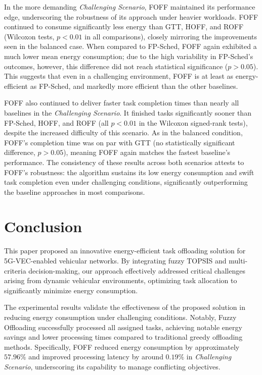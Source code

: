 \documentclass[iicol]{sn-jnl}
\begin{document}
In the more demanding \textit{Challenging Scenario}, FOFF maintained its performance edge, underscoring the robustness of its approach under heavier workloads. FOFF continued to consume significantly less energy than GTT, HOFF, and ROFF (Wilcoxon tests, $p < 0.01$ in all comparisons), closely mirroring the improvements seen in the balanced case. When compared to FP-Sched, FOFF again exhibited a much lower mean energy consumption; due to the high variability in FP-Sched’s outcomes, however, this difference did not reach statistical significance ($p > 0.05$). This suggests that even in a challenging environment, FOFF is at least as energy-efficient as FP-Sched, and markedly more efficient than the other baselines.

FOFF also continued to deliver faster task completion times than nearly all baselines in the \textit{Challenging Scenario}. It finished tasks significantly sooner than FP-Sched, HOFF, and ROFF (all $p < 0.01$ in the Wilcoxon signed-rank tests), despite the increased difficulty of this scenario. As in the balanced condition, FOFF’s completion time was on par with GTT (no statistically significant difference, $p > 0.05$), meaning FOFF again matches the fastest baseline’s performance. The consistency of these results across both scenarios attests to FOFF’s robustness: the algorithm sustains its low energy consumption and swift task completion even under challenging conditions, significantly outperforming the baseline approaches in most comparisons.

\section{Conclusion}\label{sec_conclusion}
This paper proposed an innovative energy-efficient task offloading solution for 5G-VEC-enabled vehicular networks. By integrating fuzzy TOPSIS and multi-criteria decision-making, our approach effectively addressed critical challenges arising from dynamic vehicular environments, optimizing task allocation to significantly minimize energy consumption.

The experimental results validate the effectiveness of the proposed solution in reducing energy consumption under challenging conditions. Notably, Fuzzy Offloading successfully processed all assigned tasks, achieving notable energy savings and lower processing times compared to traditional greedy offloading methods. Specifically, FOFF reduced energy consumption by approximately $57.96\%$ and improved processing latency by around $0.19\%$ in \textit{Challenging Scenario}, underscoring its capability to manage conflicting objectives.
\end{document}

